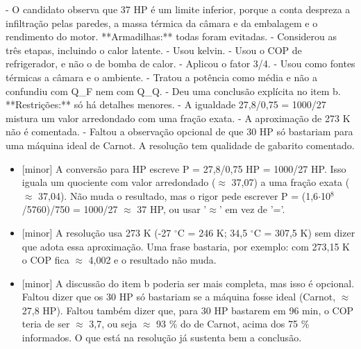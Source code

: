 \documentclass{article}%
\begin{document}
{-} O candidato observa que 37 HP é um limite inferior, porque a conta despreza a infiltração pelas paredes, a massa térmica da câmara e da embalagem e o rendimento do motor.\newline%
\newline%
**Armadilhas:** todas foram evitadas.\newline%
{-} Considerou as três etapas, incluindo o calor latente.\newline%
{-} Usou kelvin.\newline%
{-} Usou o COP de refrigerador, e não o de bomba de calor.\newline%
{-} Aplicou o fator 3/4.\newline%
{-} Usou como fontes térmicas a câmara e o ambiente.\newline%
{-} Tratou a potência como média e não a confundiu com Q\_F nem com Q\_Q.\newline%
{-} Deu uma conclusão explícita no item b.\newline%
\newline%
**Restrições:** só há detalhes menores.\newline%
{-} A igualdade 27,8/0,75 = 1000/27 mistura um valor arredondado com uma fração exata.\newline%
{-} A aproximação de 273 K não é comentada.\newline%
{-} Faltou a observação opcional de que 30 HP só bastariam para uma máquina ideal de Carnot.\newline%
\newline%
A resolução tem qualidade de gabarito comentado.%
\begin{itemize}%
\item%
{[}minor{]} A conversão para HP escreve P = 27,8/0,75 HP = 1000/27 HP. Isso iguala um quociente com valor arredondado ($\approx$ 37,07) a uma fração exata ($\approx$ 37,04). Não muda o resultado, mas o rigor pede escrever P = (1,6$\cdot$10$^{8}$/5760)/750 = 1000/27 $\approx$ 37 HP, ou usar '$\approx$' em vez de '='.%
\item%
{[}minor{]} A resolução usa 273 K (-27 $^\circ$C = 246 K; 34,5 $^\circ$C = 307,5 K) sem dizer que adota essa aproximação. Uma frase bastaria, por exemplo: com 273,15 K o COP fica $\approx$ 4,002 e o resultado não muda.%
\item%
{[}minor{]} A discussão do item b poderia ser mais completa, mas isso é opcional. Faltou dizer que os 30 HP só bastariam se a máquina fosse ideal (Carnot, $\approx$ 27,8 HP). Faltou também dizer que, para 30 HP bastarem em 96 min, o COP teria de ser $\approx$ 3,7, ou seja $\approx$ 93 \% do de Carnot, acima dos 75 \% informados. O que está na resolução já sustenta bem a conclusão.%
\end{itemize}%
\end{document}
